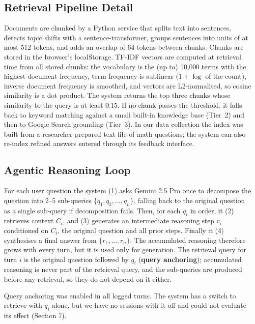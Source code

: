 \documentclass[11pt,a4paper]{article}
\begin{document}
\subsection{Retrieval Pipeline Detail}
Documents are chunked by a Python service that splits text into sentences, detects topic shifts with a
sentence-transformer, groups sentences into units of at most 512 tokens, and adds an overlap of 64 tokens
between chunks. Chunks are stored in the browser's localStorage. TF-IDF vectors are computed at retrieval
time from all stored chunks: the vocabulary is the (up to) 10,000 terms with the highest document frequency,
term frequency is sublinear ($1+\log$ of the count), inverse document frequency is smoothed, and vectors are
L2-normalised, so cosine similarity is a dot product. The system returns the top three chunks whose similarity
to the query is at least 0.15. If no chunk passes the threshold, it falls back to keyword matching against a
small built-in knowledge base (Tier~2) and then to Google Search grounding (Tier~3). In our data collection the
index was built from a researcher-prepared text file of math questions; the system can also re-index refined
answers entered through its feedback interface.

\subsection{Agentic Reasoning Loop}
For each user question the system (1) asks Gemini 2.5 Pro once to decompose the question into 2--5
sub-queries $\{q_1, q_2, \ldots, q_n\}$, falling back to the original question as a single sub-query if
decomposition fails. Then, for each $q_i$ in order, it (2) retrieves context $C_i$, and (3) generates an
intermediate reasoning step $r_i$ conditioned on $C_i$, the original question and all prior steps. Finally it (4)
synthesises a final answer from $\{r_1, \ldots, r_n\}$. The accumulated reasoning therefore grows with every
turn, but it is used only for generation. The retrieval query for turn $i$ is the original question followed by
$q_i$ (\textbf{query anchoring}); accumulated reasoning is never part of the retrieval query, and the sub-queries
are produced before any retrieval, so they do not depend on it either.

Query anchoring was enabled in all logged turns. The system has a switch to retrieve with $q_i$ alone, but we
have no sessions with it off and could not evaluate its effect (Section 7).
\end{document}
